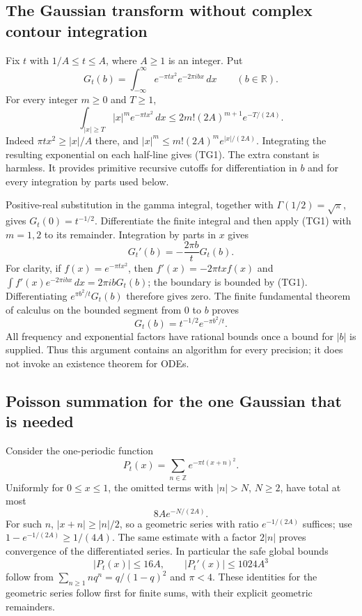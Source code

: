 \subsection{The Gaussian transform without complex contour integration}

Fix $t$ with $1/A\le t\le A$, where $A\ge1$ is an integer.  Put
\[
 G_t(b)=\int_{-\infty}^{\infty}
              e^{-\pi t x^2}e^{-2\pi ibx}\,dx \qquad(b\in\mathbb R).
\]
For every integer $m\ge0$ and $T\ge1$,
\[
 \int_{|x|\ge T}|x|^m e^{-\pi t x^2}\,dx
       \le 2m!(2A)^{m+1}e^{-T/(2A)}.                \tag{TG1}
\]
Indeed $\pi t x^2\ge |x|/A$ there, and
$|x|^m\le m!(2A)^m e^{|x|/(2A)}$.  Integrating the resulting
exponential on each half-line gives (TG1).  The extra constant is
harmless.  It provides primitive recursive cutoffs for differentiation
in $b$ and for every integration by parts used below.

Positive-real substitution in the gamma integral, together with
$\Gamma(1/2)=\sqrt\pi$, gives $G_t(0)=t^{-1/2}$.  Differentiate the
finite integral and then apply (TG1) with $m=1,2$ to its remainder.
Integration by parts in $x$ gives
\[
 G_t'(b)=-\frac{2\pi b}{t}G_t(b).
\]
For clarity, if $f(x)=e^{-\pi t x^2}$, then
$f'(x)=-2\pi txf(x)$ and
$\int f'(x)e^{-2\pi ibx}\,dx=2\pi ibG_t(b)$;
the boundary is bounded by (TG1).  Differentiating
$e^{\pi b^2/t}G_t(b)$ therefore gives zero.  The finite fundamental
theorem of calculus on the bounded segment from $0$ to $b$ proves
\[
 \boxed{G_t(b)=t^{-1/2}e^{-\pi b^2/t}.}             \tag{TG2}
\]
All frequency and exponential factors have rational bounds once a
bound for $|b|$ is supplied.  Thus this argument contains an algorithm
for every precision; it does not invoke an existence theorem for ODEs.

\subsection{Poisson summation for the one Gaussian that is needed}

Consider the one-periodic function
\[
 P_t(x)=\sum_{n\in\mathbb Z}e^{-\pi t(x+n)^2}.
\]
Uniformly for $0\le x\le1$, the omitted terms with $|n|>N$, $N\ge2$,
have total at most
\[
 8A e^{-N/(2A)}.                                    \tag{TG3}
\]
For such $n$, $|x+n|\ge |n|/2$, so a geometric series with ratio
$e^{-1/(2A)}$ suffices; use
$1-e^{-1/(2A)}\ge1/(4A)$.  The same estimate with a factor $2|n|$
proves convergence of the differentiated series.  In particular the
safe global bounds
\[
 |P_t(x)|\le16A,\qquad |P_t'(x)|\le1024A^3           \tag{TG4}
\]
follow from
$\sum_{n\ge1}nq^n=q/(1-q)^2$ and $\pi<4$.
These identities for the geometric series follow first for finite sums,
with their explicit geometric remainders.

